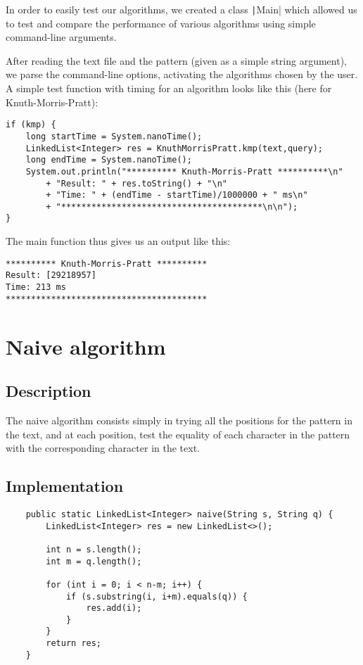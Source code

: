 \documentclass[a4paper,11pt,openany,extrafontsizes,twoside,article]{memoir}
\begin{document}
In order to easily test our algorithms, we created a class
\texttt|Main| which allowed us to test and compare the
performance of various algorithms using simple command-line arguments.

After reading the text file and the pattern (given as a simple string
argument), we parse the command-line options, activating the
algorithms chosen by the user. A simple test function with timing for
an algorithm looks like this (here for Knuth-Morris-Pratt):

\begin{verbatim}
if (kmp) {
    long startTime = System.nanoTime();
    LinkedList<Integer> res = KnuthMorrisPratt.kmp(text,query);
    long endTime = System.nanoTime();
    System.out.println("********** Knuth-Morris-Pratt **********\n"
        + "Result: " + res.toString() + "\n"
        + "Time: " + (endTime - startTime)/1000000 + " ms\n"
        + "****************************************\n\n");
}
\end{verbatim}

The main function thus gives us an output like this:

\begin{verbatim}
********** Knuth-Morris-Pratt **********
Result: [29218957]
Time: 213 ms
****************************************
\end{verbatim}

\chapter{Naive algorithm}
\label{cha:naive-algorithm}

\section{Description}
\label{sec:description}

The naive algorithm consists simply in trying all the positions for
the pattern in the text, and at each position, test the equality of
each character in the pattern with the corresponding character in the
text.

\section{Implementation}
\label{sec:implementation}

\begin{verbatim}
    public static LinkedList<Integer> naive(String s, String q) {
        LinkedList<Integer> res = new LinkedList<>();

        int n = s.length();
        int m = q.length();		

        for (int i = 0; i < n-m; i++) {
            if (s.substring(i, i+m).equals(q)) {
                res.add(i);
            }
        }
        return res;		
    }
\end{verbatim}
\end{document}

